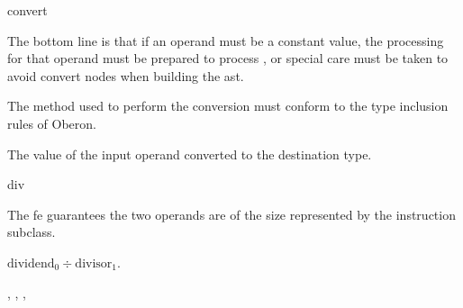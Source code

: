 \begin{instruction}{convert}
\begin{notes}
    The bottom line is that if an operand must be a constant value,
    the processing for that operand must be prepared to process
    , or special care must be taken to avoid convert
    nodes when building the \ac{ast}.

    The method used to perform the conversion must conform to the type
    inclusion rules of Oberon.
  \end{notes}

  \begin{results}
  \item The value of the input operand converted to the destination type.
  \end{results}

  \begin{operands}
  \item {}
  \end{operands}
\end{instruction}

\begin{instruction}{div}

  \begin{notes}
    The \ac{fe} guarantees the two operands are of the size
    represented by the instruction subclass.
  \end{notes}

  \begin{results}
  \item $\textrm{dividend}_0 \div \textrm{divisor}_1$.
  \end{results}

  \begin{operands}
  \item {}
  \item {}
  \end{operands}

  \begin{seealso}
    , ,
    , 
  \end{seealso}
\end{instruction}

